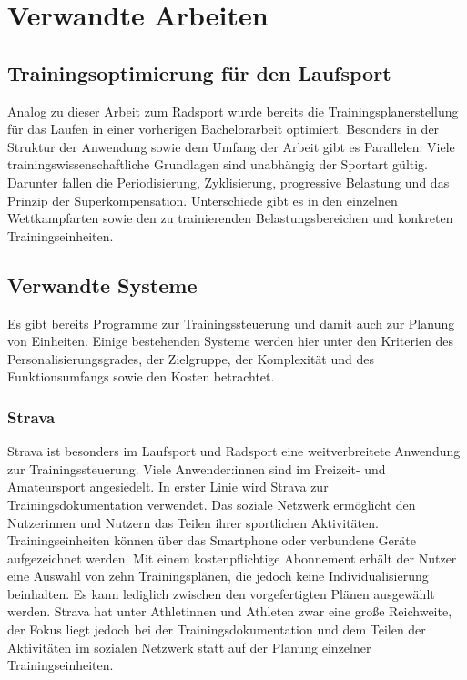 \chapter{Verwandte Arbeiten}
\label{sec:verwandt}

\section{Trainingsoptimierung für den Laufsport}
\label{sec:verwandt:sec1}
Analog zu dieser Arbeit zum Radsport wurde bereits die Trainingsplanerstellung für das Laufen in einer vorherigen Bachelorarbeit optimiert. Besonders in der Struktur der Anwendung sowie dem Umfang der Arbeit gibt es Parallelen. Viele trainingswissenschaftliche Grundlagen sind unabhängig der Sportart gültig. Darunter fallen die Periodisierung, Zyklisierung, progressive Belastung und das Prinzip der Superkompensation. Unterschiede gibt es in den einzelnen Wettkampfarten sowie den zu trainierenden Belastungsbereichen und konkreten Trainingseinheiten.

\section{Verwandte Systeme}
Es gibt bereits Programme zur Trainingssteuerung und damit auch zur Planung von Einheiten. Einige bestehenden Systeme werden hier unter den Kriterien des Personalisierungsgrades, der Zielgruppe, der Komplexität und des Funktionsumfangs sowie den Kosten betrachtet.

\subsection{Strava}
Strava\cite{StravaWeb} ist besonders im Laufsport und Radsport eine weitverbreitete Anwendung zur Trainingssteuerung. Viele Anwender:innen sind im Freizeit- und Amateursport angesiedelt. In erster Linie wird Strava zur Trainingsdokumentation verwendet. Das soziale Netzwerk ermöglicht den Nutzerinnen und  Nutzern das Teilen ihrer sportlichen Aktivitäten. Trainingseinheiten können über das Smartphone oder verbundene Geräte aufgezeichnet werden. Mit einem kostenpflichtige Abonnement erhält der Nutzer eine Auswahl von zehn Trainingsplänen, die jedoch keine Individualisierung beinhalten. Es kann lediglich zwischen den vorgefertigten Plänen ausgewählt werden. Strava hat unter Athletinnen und Athleten zwar eine große Reichweite, der Fokus liegt jedoch bei der Trainingsdokumentation und dem Teilen der Aktivitäten im sozialen Netzwerk statt auf der Planung einzelner Trainingseinheiten.

